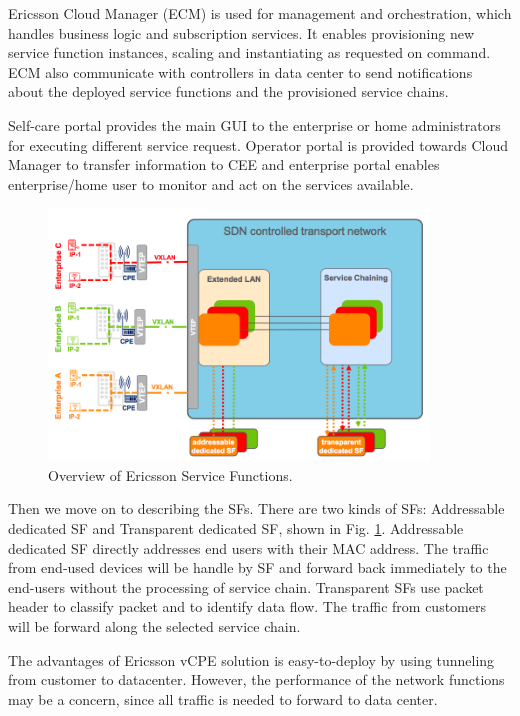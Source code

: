 Ericsson Cloud Manager (ECM) is used for management and orchestration, which handles business logic and subscription services.
It enables provisioning new service function instances, scaling and instantiating as requested on command.
ECM also communicate with controllers in data center to send notifications about the deployed service functions and the provisioned service chains.

Self-care portal provides the main GUI to the enterprise or home administrators for executing different service request.
Operator portal is provided towards Cloud Manager to transfer information to CEE and enterprise portal enables enterprise/home user to monitor and act on the services available.


\begin{figure}[!t]
\centering
\includegraphics[width=0.9\textwidth]{./fig/ericsson_sf.png}
\caption{Overview of Ericsson Service Functions. \cite{ericsson-vcpe}}
\label{fig:ericsson_sf}
\end{figure}

Then we move on to describing the SFs. There are two kinds of SFs: Addressable dedicated SF and Transparent dedicated SF, shown in Fig. \ref{fig:ericsson_sf}.
Addressable dedicated SF directly addresses end users with their MAC address.
The traffic from end-used devices will be handle by SF and forward back immediately to the end-users without the processing of service chain.
Transparent SFs use packet header to classify packet and to identify data flow.
The traffic from customers will be forward along the selected service chain.

The advantages of Ericsson vCPE solution is easy-to-deploy by using tunneling from customer to datacenter.
However, the performance of the network functions may be a concern, since all traffic is needed to forward to data center.



